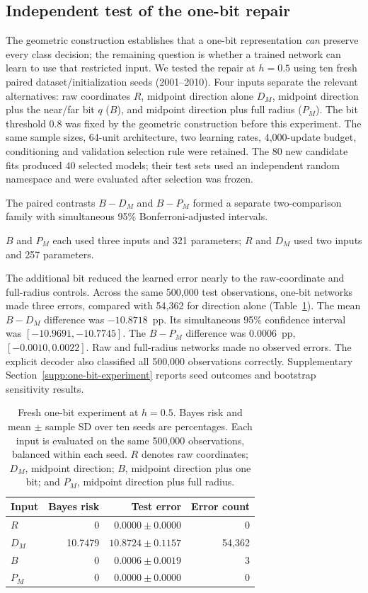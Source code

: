 \subsection{Independent test of the one-bit repair}
\label{sec:one-bit-experiment}
The geometric construction establishes that a one-bit representation \emph{can} preserve every class decision; the remaining question is whether a trained network can learn to use that restricted input. We tested the repair at $h=0.5$ using ten fresh paired dataset/initialization seeds (2001--2010). Four inputs separate the relevant alternatives: raw coordinates $R$, midpoint direction alone $D_M$, midpoint direction plus the near/far bit $q$ ($B$), and midpoint direction plus full radius ($P_M$). The bit threshold $0.8$ was fixed by the geometric construction before this experiment. The same sample sizes, 64-unit architecture, two learning rates, 4,000-update budget, conditioning and validation selection rule were retained. The 80 new candidate fits produced 40 selected models; their test sets used an independent random namespace and were evaluated after selection was frozen. \par\begin{samepage}
\noindent The paired contrasts $B-D_M$ and $B-P_M$ formed a separate two-comparison family with simultaneous 95\% Bonferroni-adjusted intervals.
\end{samepage} $B$ and $P_M$ each used three inputs and 321 parameters; $R$ and $D_M$ used two inputs and 257 parameters.

The additional bit reduced the learned error nearly to the raw-coordinate and full-radius controls. Across the same 500,000 test observations, one-bit networks made three errors, compared with 54,362 for direction alone (Table~\ref{tab:one-bit-neural}). The mean $B-D_M$ difference was $-10.8718$~pp. Its simultaneous 95\% confidence interval was $[-10.9691,-10.7745]$. The $B-P_M$ difference was $0.0006$~pp, $[-0.0010,0.0022]$. Raw and full-radius networks made no observed errors. The explicit decoder also classified all 500,000 observations correctly. Supplementary Section~\ref{supp:one-bit-experiment} reports seed outcomes and bootstrap sensitivity results.

\begin{table}[t]
\centering\small
\setlength{\tabcolsep}{3pt}
\caption{Fresh one-bit experiment at $h=0.5$. Bayes risk and mean $\pm$ sample SD over ten seeds are percentages. Each input is evaluated on the same 500,000 observations, balanced within each seed. $R$ denotes raw coordinates; $D_M$, midpoint direction; $B$, midpoint direction plus one bit; and $P_M$, midpoint direction plus full radius.}
\label{tab:one-bit-neural}
\begin{tabular}{lrrr}
\toprule
Input & Bayes risk & Test error & Error count \\
\midrule
$R$ & 0 & $0.0000\pm0.0000$ & 0 \\
$D_M$ & 10.7479 & $10.8724\pm0.1157$ & 54,362 \\
$B$ & 0 & $0.0006\pm0.0019$ & 3 \\
$P_M$ & 0 & $0.0000\pm0.0000$ & 0 \\
\bottomrule
\end{tabular}
\end{table}

